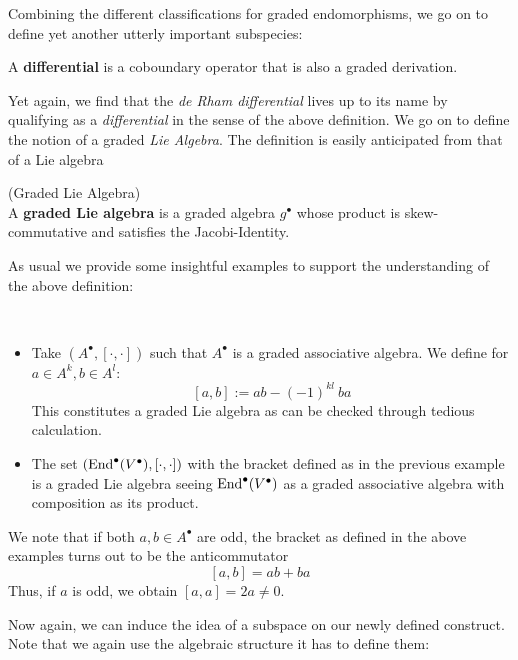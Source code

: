 Combining the different classifications for graded endomorphisms, we go on to define yet another utterly important subspecies:

\begin{definition}
  A \textbf{differential} is a coboundary operator that is also a graded derivation.
\end{definition}

Yet again, we find that the \emph{de Rham differential} lives up to its name by qualifying as a \emph{differential} in the sense of the above definition. We go on to define the notion of a graded \emph{Lie Algebra}. The definition is easily anticipated from that of a Lie algebra

\begin{definition} (Graded Lie Algebra)\\
  A \textbf{graded Lie algebra} is a graded algebra $g^\bullet$ whose product is skew-commutative and satisfies the Jacobi-Identity.
\end{definition}

As usual we provide some insightful examples to support the understanding of the above definition:

\begin{example}~
\begin{itemize}
  \item Take $(A^\bullet, [\cdot , \cdot ])$ such that $A^\bullet$ is a graded associative algebra. We define for $a \in A^k,b \in A^l$:
  $$ [a,b] := ab-(-1)^{kl} \ ba$$ This constitutes a graded Lie algebra as can be checked through tedious calculation.

  \item The set $(\operatorname{End}^\bullet(V^\bullet), [\cdot,\cdot])$ with the bracket defined as in the previous example is a graded Lie algebra seeing $\operatorname{End}^\bullet(V^\bullet)$ as a graded associative algebra with composition as its product.
\end{itemize}
\end{example}

\begin{rem}
  We note that if both $a,b \in A^\bullet$ are odd, the bracket as defined in the above examples turns out to be the anticommutator
  $$ [a,b] = ab+ba $$ Thus, if $a$ is odd, we obtain $[a,a] = 2a \neq 0$.
\end{rem}

Now again, we can induce the idea of a subspace on our newly defined construct. Note that we again use the algebraic structure it has to define them:

